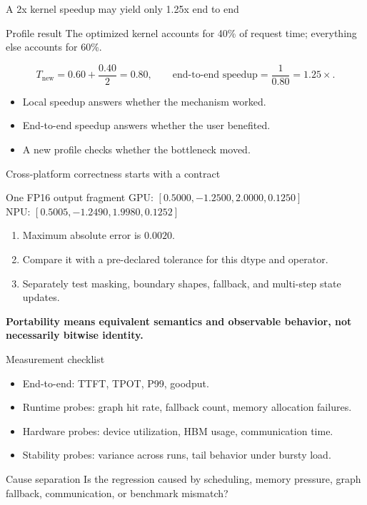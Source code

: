 \documentclass[aspectratio=169,11pt]{beamer}
\newcommand{\key}[1]{\textcolor{HUSTDeep}{\textbf{#1}}}
\begin{document}
\begin{frame}{A 2x kernel speedup may yield only 1.25x end to end}
  \begin{block}{Profile result}
    The optimized kernel accounts for 40\% of request time; everything else accounts for 60\%.
  \end{block}
  \[
    T_{\text{new}}=0.60+\frac{0.40}{2}=0.80,
    \qquad
    \text{end-to-end speedup}=\frac{1}{0.80}=1.25\times.
  \]
  \begin{itemize}
    \item Local speedup answers whether the mechanism worked.
    \item End-to-end speedup answers whether the user benefited.
    \item A new profile checks whether the bottleneck moved.
  \end{itemize}
\end{frame}

\begin{frame}{Cross-platform correctness starts with a contract}
  \begin{block}{One FP16 output fragment}
    GPU: \([0.5000,-1.2500,2.0000,0.1250]\)\\
    NPU: \([0.5005,-1.2490,1.9980,0.1252]\)
  \end{block}
  \begin{enumerate}
    \item Maximum absolute error is \(0.0020\).
    \item Compare it with a pre-declared tolerance for this dtype and operator.
    \item Separately test masking, boundary shapes, fallback, and multi-step state updates.
  \end{enumerate}
  \vspace{0.2cm}
  \key{Portability means equivalent semantics and observable behavior, not necessarily bitwise identity.}
\end{frame}

\iffalse %
\begin{frame}{Measurement checklist}
  \begin{itemize}
    \item End-to-end: TTFT, TPOT, P99, goodput.
    \item Runtime probes: graph hit rate, fallback count, memory allocation failures.
    \item Hardware probes: device utilization, HBM usage, communication time.
    \item Stability probes: variance across runs, tail behavior under bursty load.
  \end{itemize}
  \vspace{0.3cm}
  \begin{block}{Cause separation}
    Is the regression caused by scheduling, memory pressure, graph fallback, communication, or benchmark mismatch?
  \end{block}
\end{frame}
\end{document}
